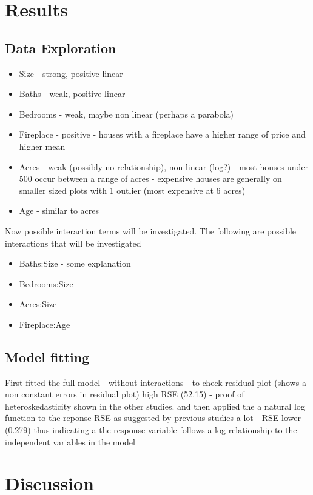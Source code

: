 \documentclass[10pt,A4,makeidx]{article}
\begin{document}
\section{Results}
  \subsection{Data Exploration}
  \begin{itemize}
    \item Size - strong, positive linear
    \item Baths - weak, positive linear
    \item Bedrooms - weak, maybe non linear (perhaps a parabola)
    \item Fireplace - positive - houses with a fireplace have a higher range of price
    and higher mean
    \item Acres - weak (possibly no relationship), non linear (log?) - most houses under 
    500 occur between a range of acres - expensive houses are generally on smaller
    sized plots with 1 outlier (most expensive at 6 acres)
    \item Age - similar to acres 
  \end{itemize}

  Now possible interaction terms will be investigated. The following are possible 
  interactions that will be investigated
  \begin{itemize}
  \item Baths:Size - some explanation
  \item Bedrooms:Size
  \item Acres:Size
  \item Fireplace:Age
  \end{itemize}

  \subsection{Model fitting}
  First fitted the full model - without interactions - to check residual plot
  (shows a non constant errors in residual plot) high RSE (52.15) - proof of 
  heteroskedasticity shown in the other studies.
  and then applied the  a natural log function to the reponse RSE as suggested by
  previous studies a lot - RSE lower (0.279) thus indicating a the response variable
  follows a log relationship to the independent variables in the model
\section{Discussion}
\end{document}
